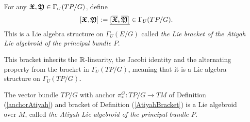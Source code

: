 \begin{definition}\label{AtiyahBracket}
For any $\bm{\mathfrak{X}}, \bm{\mathfrak{Y}} \in \Gamma_U(TP/G)$, define 
\begin{align} \label{bracketDefn}
    [\bm{\mathfrak{X}}, \bm{\mathfrak{Y}}] := \underline{\bm{[\overline{\bm{\bm{\mathfrak{X}}}}, \overline{\bm{\bm{\mathfrak{Y}}}}]}} \in \Gamma_U(TP/G).
\end{align}
This is a Lie algebra structure on $\Gamma_U(E/G)$ called \emph{the Lie bracket of the Atiyah Lie algebroid of the principal bundle $P$}.
\end{definition}

This bracket inherits the $\mathbb{R}$-linearity, the Jacobi identity and the alternating property from the bracket in $\Gamma_U(TP/G)$, meaning that it is a Lie algebra structure on $\Gamma_U(TP/G)$.

\begin{theorem}
The vector bundle $TP/G$ with anchor $\pi_*^G:TP/G \to TM$ of Definition (\ref{anchorAtiyah}) and bracket of Definition (\ref{AtiyahBracket}) is a Lie algebroid over $M$, called \emph{the Atiyah Lie algebroid of the principal bundle $P$}.
\end{theorem}


